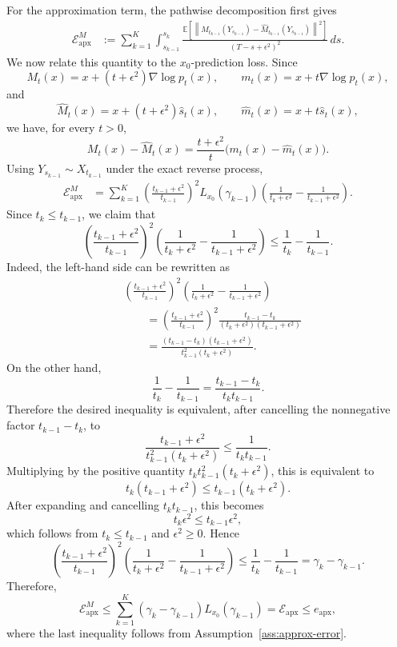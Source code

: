 \documentclass[11pt]{article}
\newcommand{\E}{\mathbb{E}}
\newcommand{\eps}{\epsilon}
\newcommand{\norm}[1]{\left\lVert #1 \right\rVert}
\begin{document}
For the approximation term, the pathwise decomposition first gives
\[
\begin{aligned}
    \mathcal E_{\mathrm{apx}}^{M}
    &:=
    \sum_{k=1}^K
    \int_{s_{k-1}}^{s_k}
    \frac{
    \E\!\left[
    \norm{
    M_{t_{k-1}}(Y_{s_{k-1}})
    -
    \widehat M_{t_{k-1}}(Y_{s_{k-1}})
    }^2
    \right]
    }{(T-s+\eps^2)^2}\,ds .
\end{aligned}
\]
We now relate this quantity to the \(x_0\)-prediction loss. Since
\[
    M_t(x)=x+(t+\eps^2)\nabla\log p_t(x),
    \qquad
    m_t(x)=x+t\nabla\log p_t(x),
\]
and
\[
    \widehat M_t(x)=x+(t+\eps^2)\widehat s_t(x),
    \qquad
    \widehat m_t(x)=x+t\widehat s_t(x),
\]
we have, for every \(t>0\),
\[
    M_t(x)-\widehat M_t(x)
    =
    \frac{t+\eps^2}{t}
    \bigl(m_t(x)-\widehat m_t(x)\bigr).
\]
Using \(Y_{s_{k-1}}\sim X_{t_{k-1}}\) under the exact reverse process,
\[
\begin{aligned}
    \mathcal E_{\mathrm{apx}}^{M}
    &=
    \sum_{k=1}^K
    \left(
    \frac{t_{k-1}+\eps^2}{t_{k-1}}
    \right)^2
    L_{x_0}(\gamma_{k-1})
    \left(
    \frac{1}{t_k+\eps^2}
    -
    \frac{1}{t_{k-1}+\eps^2}
    \right).
\end{aligned}
\]
Since \(t_k\le t_{k-1}\), we claim that
\[
    \left(
    \frac{t_{k-1}+\eps^2}{t_{k-1}}
    \right)^2
    \left(
    \frac{1}{t_k+\eps^2}
    -
    \frac{1}{t_{k-1}+\eps^2}
    \right)
    \le
    \frac{1}{t_k}-\frac{1}{t_{k-1}} .
\]
Indeed, the left-hand side can be rewritten as
\[
\begin{aligned}
    &
    \left(
    \frac{t_{k-1}+\eps^2}{t_{k-1}}
    \right)^2
    \left(
    \frac{1}{t_k+\eps^2}
    -
    \frac{1}{t_{k-1}+\eps^2}
    \right)  \\
    &\qquad =
    \left(
    \frac{t_{k-1}+\eps^2}{t_{k-1}}
    \right)^2
    \frac{t_{k-1}-t_k}
    {(t_k+\eps^2)(t_{k-1}+\eps^2)}  \\
    &\qquad =
    \frac{
    (t_{k-1}-t_k)(t_{k-1}+\eps^2)
    }{
    t_{k-1}^2(t_k+\eps^2)
    } .
\end{aligned}
\]
On the other hand,
\[
    \frac{1}{t_k}-\frac{1}{t_{k-1}}
    =
    \frac{t_{k-1}-t_k}{t_kt_{k-1}} .
\]
Therefore the desired inequality is equivalent, after cancelling the
nonnegative factor \(t_{k-1}-t_k\), to
\[
    \frac{t_{k-1}+\eps^2}
    {t_{k-1}^2(t_k+\eps^2)}
    \le
    \frac{1}{t_kt_{k-1}} .
\]
Multiplying by the positive quantity
\(t_k t_{k-1}^2(t_k+\eps^2)\), this is equivalent to
\[
    t_k(t_{k-1}+\eps^2)
    \le
    t_{k-1}(t_k+\eps^2).
\]
After expanding and cancelling \(t_kt_{k-1}\), this becomes
\[
    t_k\eps^2\le t_{k-1}\eps^2,
\]
which follows from \(t_k\le t_{k-1}\) and \(\eps^2\ge0\). Hence
\[
    \left(
    \frac{t_{k-1}+\eps^2}{t_{k-1}}
    \right)^2
    \left(
    \frac{1}{t_k+\eps^2}
    -
    \frac{1}{t_{k-1}+\eps^2}
    \right)
    \le
    \frac{1}{t_k}-\frac{1}{t_{k-1}}
    =
    \gamma_k-\gamma_{k-1}.
\]
Therefore,
\[
    \mathcal E_{\mathrm{apx}}^{M}
    \le
    \sum_{k=1}^K
    (\gamma_k-\gamma_{k-1})L_{x_0}(\gamma_{k-1})
    =
    \mathcal E_{\mathrm{apx}}
    \le e_{\mathrm{apx}},
\]
where the last inequality follows from Assumption~\ref{ass:approx-error}.
\end{document}
